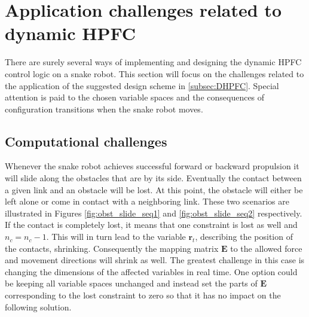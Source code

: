 




\section{Application challenges related to dynamic HPFC}

There are surely several ways of implementing and designing the dynamic HPFC control logic on a snake robot. This section will focus on the challenges related to the application of the suggested design scheme in \ref{subsec:DHPFC}. Special attention is paid to the chosen variable spaces and the consequences of configuration transitions when the snake robot moves.

\subsection{Computational challenges}

Whenever the snake robot achieves successful forward or backward propulsion it will slide along the obstacles that are by its side. Eventually the contact between a given link and an obstacle will be lost. At this point, the obstacle will either be left alone or come in contact with a neighboring link. These two scenarios are illustrated in Figures \ref{fig:obst_slide_seq1} and \ref{fig:obst_slide_seq2} respectively. If the contact is completely lost, it means that one constraint is lost as well and $n_c = n_c - 1$. This will in turn lead to the variable $\mathbf{r}_t$, describing the position of the contacts, shrinking. Consequently the mapping matrix $\mathbf{E}$ to the allowed force and movement directions will shrink as well. The greatest challenge in this case is changing the dimensions of the affected variables in real time. One option could be keeping all variable spaces unchanged and instead set the parts of $\mathbf{E}$ corresponding to the lost constraint to zero so that it has no impact on the following solution.

